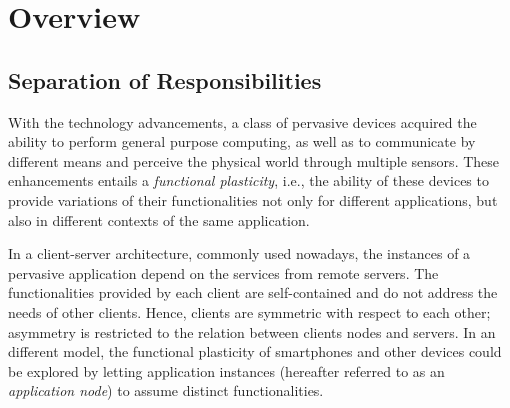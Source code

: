 \section{Overview}\label{sec:overview}

\subsection{Separation of Responsibilities}


With the technology advancements, a class of pervasive devices acquired the ability to perform general purpose computing, as well as to communicate by different means and perceive the physical world through multiple sensors. These enhancements entails a \textit{functional plasticity}, i.e., the ability of these devices to provide variations of their functionalities not only for different applications, but also in different contexts of the same application. 

In a client-server architecture, commonly used nowadays, the instances of a pervasive application depend on the services from remote servers. The functionalities provided by each client are self-contained and do not address the needs of other clients. Hence, clients are symmetric with respect to each other; asymmetry is restricted to the relation between clients nodes and servers. 
In an different model, the functional plasticity of smartphones and other devices could be explored by letting application instances (hereafter referred to as an \textit{application node}) to assume distinct functionalities.



